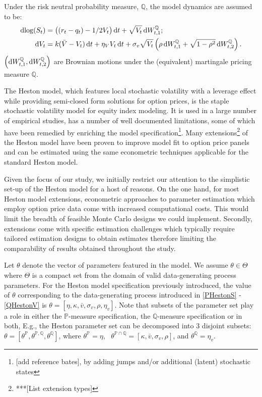\documentclass[11pt,a4paper,notitlepage]{article}
\numberwithin{equation}{section}
\begin{document}
Under the risk neutral probability measure, $\mathbb{Q}$, the model dynamics are assumed to be: 
\begin{align}
	\dif{\log(S_t)} &= \left( (r_t-q_t) - 1/2 V_t\right) \dif t + \sqrt{V_t} \dif W_{t,1}^\mathbb{Q};\label{QHestonS}\\
	\dif{V_t} &= k(\bar{V}-V_t)\dif t + \eta_{V}V_t\dif t + \sigma_v\sqrt{V_t}\left(\rho \dif W_{t,1}^\mathbb{Q} + \sqrt{1-\rho^2}\dif W_{t,2}^\mathbb{Q}\right).\label{QHestonV}
\end{align}
$\left(\dif W_{t,1}^\mathbb{Q}, \dif W_{t,2}^\mathbb{Q}\right)$ are Brownian motions under the (equivalent) martingale pricing measure $\mathbb{Q}$.

The Heston model, which features local stochastic volatility with a leverage effect while providing semi-closed form solutions for option prices, is the staple stochastic volatility model for equity index modeling. It is used in a large number of empirical studies, has a number of well documented limitations, some of which have been remedied by enriching the model specification\footnote{[add reference bates], by adding jumps and/or additional (latent) stochastic states}. Many extensions\footnote{***[List extension types]} of the Heston model have been proven to improve model fit to option price panels and can be estimated using the same econometric techniques applicable for the standard Heston model.

Given the focus of our study, we initially restrict our attention to the simplistic set-up of the Heston model for a host of reasons. On the one hand, for most Heston model extensions, econometric approaches to parameter estimation which employ option price data come with increased computational costs. This would limit the breadth of feasible Monte Carlo designs we could implement. 
Secondly, extensions come with specific estimation challenges which typically require tailored estimation designs to obtain estimates therefore limiting the comparability of results obtained throughout the study. 

Let $\theta$ denote the vector of parameters featured in the model. We assume $\theta \in \Theta$ where $\Theta$ is a compact set from the domain of valid data-generating process parameters. For the Heston model specification previously introduced, the value of $\theta$ corresponding to the data-generating process introduced in \eqref{PHestonS} - \eqref{QHestonV} is $\theta = \left[\eta, \kappa, \bar{v}, \sigma_v, \rho, \eta_v\right]$. Note that subsets of the parameter set play a role in either the $\mathbb{P}$-measure specification, the $\mathbb{Q}$-measure specification or in both, E.g., the Heston parameter set can be decomposed into 3 disjoint subsets: $\theta = \left[\theta^\mathbb{P}, \theta^{\mathbb{P},\mathbb{Q}}, \theta^\mathbb{Q}\right]$, where $\theta^\mathbb{P} = \eta$,~ $\theta^{\mathbb{P}\cap\mathbb{Q}} = \left[\kappa, \bar{v}, \sigma_v, \rho\right]$, and $\theta^\mathbb{Q} = \eta_v$. 
\end{document}
